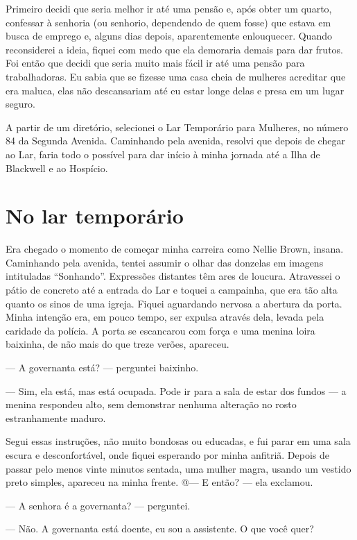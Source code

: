 Primeiro decidi que seria melhor ir até uma pensão e, após obter um
quarto, confessar à senhoria (ou senhorio, dependendo de quem fosse) que
estava em busca de emprego e, alguns dias depois, aparentemente
enlouquecer. Quando reconsiderei a ideia, fiquei com medo que ela
demoraria demais para dar frutos. Foi então que decidi que seria muito
mais fácil ir até uma pensão para trabalhadoras. Eu sabia que se fizesse
uma casa cheia de mulheres acreditar que era maluca, elas não
descansariam até eu estar longe delas e presa em um lugar seguro.

A partir de um diretório, selecionei o Lar Temporário para Mulheres, no
número 84 da Segunda Avenida. Caminhando pela avenida, resolvi que
depois de chegar ao Lar, faria todo o possível para dar início à minha
jornada até a Ilha de Blackwell e ao Hospício.

\chapter{No lar
temporário}\label{capuxedtulo-iii-no-lar-temporuxe1rio}

Era chegado o momento de começar minha carreira como Nellie Brown,
insana. Caminhando pela avenida, tentei assumir o olhar das donzelas em
imagens intituladas ``Sonhando''. Expressões distantes têm ares de
loucura. Atravessei o pátio de concreto até a entrada do Lar e toquei a
campainha, que era tão alta quanto os sinos de uma igreja. Fiquei
aguardando nervosa a abertura da porta. Minha intenção era, em pouco
tempo, ser expulsa através dela, levada pela caridade da polícia. A
porta se escancarou com força e uma menina loira baixinha, de não mais
do que treze verões, apareceu.

--- A governanta está? --- perguntei baixinho.

--- Sim, ela está, mas está ocupada. Pode ir para a sala de estar dos
fundos --- a menina respondeu alto, sem demonstrar nenhuma alteração no
rosto estranhamente maduro.

Segui
essas instruções, não muito bondosas ou educadas, e fui parar em uma
sala escura e desconfortável, onde fiquei esperando por minha anfitriã.
Depois de passar pelo menos vinte minutos sentada, uma mulher magra,
usando um vestido preto simples, apareceu na minha frente. @--- E então?
--- ela exclamou.

--- A senhora é a governanta? --- perguntei.

--- Não. A governanta está doente, eu sou a assistente. O que você quer?

